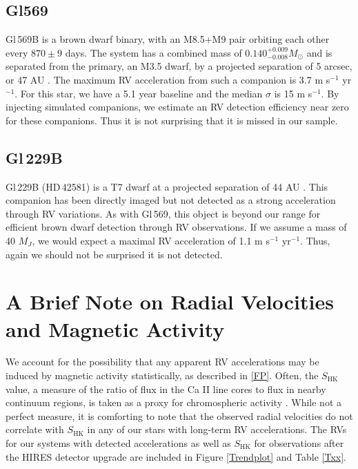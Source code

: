 \subsection{Gl569}
Gl\,569B is a brown dwarf binary, with an M8.5+M9 pair orbiting each other every $870 \pm 9$ days. The system has a combined mass of $0.140^{+0.009}_{-0.008} M_\odot$ \citep{Dupuy10} and is separated from the primary, an M3.5 dwarf, by a projected separation of 5 arcsec, or 47 AU \citep{Femenia11}. The maximum RV acceleration from such a companion is 3.7 m s$^{-1}$ yr$^{-1}$. For this star, we have a 5.1 year baseline and the median $\sigma$ is 15 m s$^{-1}$. By injecting simulated companions, we estimate an RV detection efficiency near zero for these companions. Thus it is not surprising that it is missed in our sample. 

\subsection{Gl\,229B}
Gl\,229B (HD\,42581) is a T7 dwarf at a projected separation of 44 AU \citep{Faherty09}. This companion has been directly imaged \citep{Nakajima95} but not detected as a strong acceleration through RV variations. As with Gl\,569, this object is beyond our range for efficient brown dwarf detection through RV observations. If we assume a mass of 40 $M_J$, we would expect a maximal RV acceleration of 1.1 m s$^{-1}$ yr$^{-1}$. Thus, again we should not be surprised it is not detected.

\section{A Brief Note on Radial Velocities and Magnetic Activity}
We account for the possibility that any apparent RV accelerations may be induced by magnetic activity statistically, as described in \textsection\ref{FP}. Often, the $S_\textrm{HK}$ value, a measure of the ratio of flux in the Ca II line cores to flux in nearby continuum regions, is taken as a proxy for chromospheric activity \citep{Wilson68, Henry96}. While not a perfect measure, it is comforting to note that the observed radial velocities do not correlate with $S_\textrm{HK}$ in any of our stars with long-term RV accelerations. The RVs for our systems with detected accelerations as well as $S_\textrm{HK}$ for observations after the HIRES detector upgrade are included in Figure \ref{Trendplot} and Table \ref{Txx}. 

